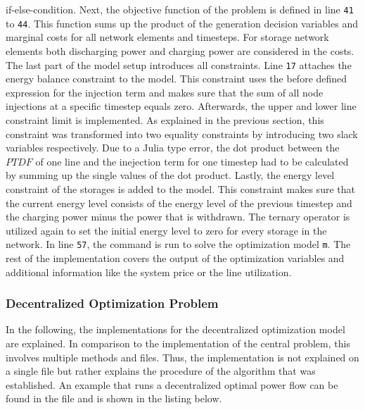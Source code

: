 if-else-condition. Next, the objective function of the problem is defined in line \texttt{41} to \texttt{44}. This function sums up the product of the generation decision variables and marginal costs for all network elements and timesteps. For storage network elements both discharging power and charging power are considered in the costs. The last part of the model setup introduces all constraints. Line \texttt{17} attaches the energy balance constraint to the model. This constraint uses the before defined expression for the injection term and makes sure that the sum of all node injections at a specific timestep equals zero. Afterwards, the upper and lower line constraint limit is implemented. As explained in the previous section, this constraint was transformed into two equality constraints by introducing two slack variables respectively. Due to a Julia type error, the dot product between the $PTDF$ of one line and the inejection term for one timestep had to be calculated by summing up the single values of the dot product. Lastly, the energy level constraint of the storages is added to the model. This constraint makes sure that the current energy level consists of the energy level of the previous timestep and the charging power minus the power that is withdrawn. The ternary operator is utilized again to set the initial energy level to zero for every storage in the network. In line \texttt{57}, the command is run to solve the optimization model \lstinline[language=julia]{m}. The rest of the implementation covers the output of the optimization variables and additional information like the system price or the line utilization.


\subsubsection{Decentralized Optimization Problem}

In the following, the implementations for the decentralized optimization model are explained. In comparison to the implementation of the central problem, this involves multiple methods and files. Thus, the implementation is not explained on a single file but rather explains the procedure of the algorithm that was established. An example that runs a decentralized optimal power flow can be found in the file  and is shown in the listing below.



